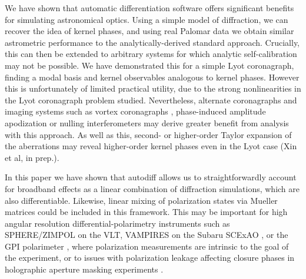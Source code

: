 \documentclass[modern]{aastex63}
\begin{document}
We have shown that automatic differentiation software offers significant benefits for simulating astronomical optics. Using a simple model of diffraction, we can recover the idea of kernel phases, and using real Palomar data we obtain similar astrometric performance to the analytically-derived standard approach. Crucially, this can then be extended to arbitrary systems for which analytic self-calibration may not be possible. We have demonstrated this for a simple Lyot coronagraph, finding a modal basis and kernel observables analogous to kernel phases. However this is unfortunately of limited practical utility, due to the strong nonlinearities in the Lyot coronagraph problem studied. Nevertheless, alternate coronagraphs and imaging systems such as vortex coronagraphs \citep{foo05}, phase-induced amplitude apodization \citep[`PIAA'][]{guyon03} or nulling interferometers \citep{bracwell78} may derive greater benefit from analysis with this approach. As well as this, second- or higher-order Taylor expansion of the aberrations may reveal higher-order kernel phases even in the Lyot case (Xin et al, in prep.).

In this paper we have shown that autodiff allows us to straightforwardly account for broadband effects as a linear combination of diffraction simulations, which are also differentiable. Likewise, linear mixing of polarization states via Mueller matrices could be included in this framework. This may be important for high angular resolution differential-polarimetry instruments such as SPHERE/ZIMPOL \citep{zimpol} on the VLT, VAMPIRES on the Subaru SCExAO \citep{vampires}, or the GPI polarimeter \citep{gpipol}, where polarization measurements are intrinsic to the goal of the experiment, or to issues with polarization leakage affecting closure phases in holographic aperture masking experiments \citep[e.g.][]{doelman18}. 
\end{document}
